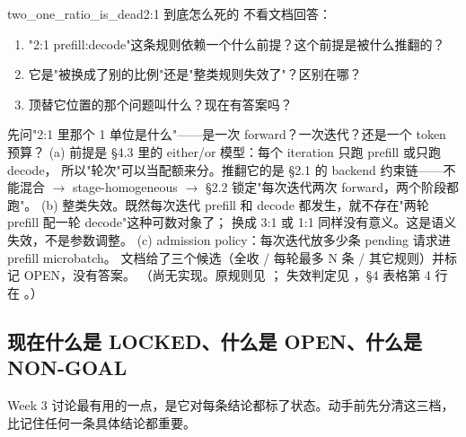 \begin{checkpoint}{two_one_ratio_is_dead}{2:1 到底怎么死的}
不看文档回答：
\begin{enumerate}[label=(\alph*)]
  \item "2:1 prefill:decode"这条规则依赖一个什么前提？这个前提是被什么推翻的？
  \item 它是"被换成了别的比例"还是"整类规则失效了"？区别在哪？
  \item 顶替它位置的那个问题叫什么？现在有答案吗？
\end{enumerate}
\hint 先问"2:1 里那个 1 单位是什么"——是一次 forward？一次迭代？还是一个 token 预算？
\ifshowanswers
\tcblower
\answer (a) 前提是  §4.3 里的 either/or 模型：每个 iteration 只跑 prefill 或只跑 decode，
所以"轮次"可以当配额来分。推翻它的是 §2.1 的 backend 约束链——不能混合 $\to$ stage-homogeneous $\to$
§2.2 锁定"每次迭代两次 forward，两个阶段都跑"。
(b) 整类失效。既然每次迭代 prefill 和 decode 都发生，就不存在"两轮 prefill 配一轮 decode"这种可数对象了；
换成 3:1 或 1:1 同样没有意义。这是语义失效，不是参数调整。
(c) admission policy：每次迭代放多少条 pending 请求进 prefill microbatch。
文档给了三个候选（全收 / 每轮最多 N 条 / 其它规则）并标记 OPEN，没有答案。
\whereincode （尚无实现。原规则见 ；
失效判定见 ，§4 表格第 4 行在
。）
\fi
\end{checkpoint}

\subsection{现在什么是 LOCKED、什么是 OPEN、什么是 NON-GOAL}
\label{sec:cb-status}

Week 3 讨论最有用的一点，是它对每条结论都标了状态。动手前先分清这三档，
比记住任何一条具体结论都重要。

